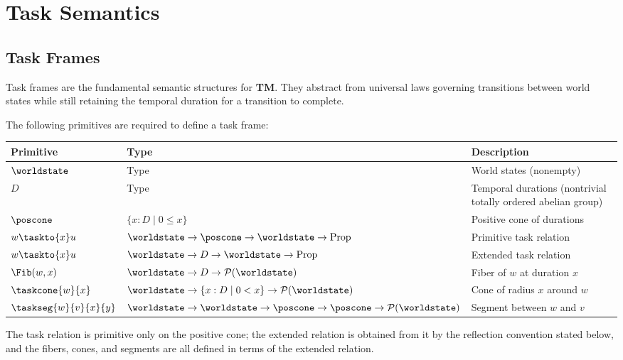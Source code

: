 \documentclass[../BimodalReference.tex]{subfiles}
\begin{document}
\section{Task Semantics}

\subsection{Task Frames}

Task frames are the fundamental semantic structures for \textbf{TM}.
They abstract from universal laws governing transitions between world states while still retaining the temporal duration for a transition to complete.

The following primitives are required to define a task frame:

\begin{center}
\begin{tabular}{@{}lll@{}}
\toprule
Primitive & Type & Description \\
\midrule
$\worldstate$ & Type & World states (nonempty) \\
$D$ & Type & Temporal durations (nontrivial totally ordered abelian group) \\
$\poscone$ & $\{x : D \mid 0 \leq x\}$ & Positive cone of durations \\
$w \taskto{x} u$ & $\worldstate \to \poscone \to \worldstate \to \text{Prop}$ & Primitive task relation \\
$w \taskto{x} u$ & $\worldstate \to D \to \worldstate \to \text{Prop}$ & Extended task relation \\
$\Fib(w, x)$ & $\worldstate \to D \to \mathcal{P}(\worldstate)$ & Fiber of $w$ at duration $x$ \\
$\taskcone{w}{x}$ & $\worldstate \to \{x : D \mid 0 < x\} \to \mathcal{P}(\worldstate)$ & Cone of radius $x$ around $w$ \\
$\taskseg{w}{v}{x}{y}$ & $\worldstate \to \worldstate \to \poscone \to \poscone \to \mathcal{P}(\worldstate)$ & Segment between $w$ and $v$ \\
\bottomrule
\end{tabular}
\end{center}

\noindent
The task relation is primitive only on the positive cone; the extended relation is obtained from it by the reflection convention stated below, and the fibers, cones, and segments are all defined in terms of the extended relation.
\end{document}
